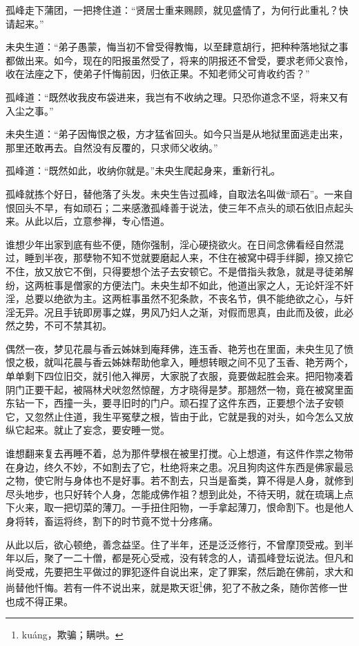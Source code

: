 \documentclass[a4paper,12pt,UTF8,twoside]{ctexbook}
\begin{document}
孤峰走下蒲团，一把搀住道：“贤居士重来赐顾，就见盛情了，为何行此重礼？快请起来。”

未央生道：“弟子愚蒙，悔当初不曾受得教悔，以至肆意胡行，把种种落地狱之事都做出来。如今，现在的阳报虽然受了，将来的阴报还不曾受，要求老师父哀怜，收在法座之下，使弟子忏悔前因，归依正果。不知老师父可肯收约否？”

孤峰道：“既然收我皮布袋进来，我岂有不收纳之理。只恐你道念不坚，将来又有入尘之事。”

未央生道：“弟子因悔恨之极，方才猛省回头。如今只当是从地狱里面逃走出来，那里还敢再去。自然没有反覆的，只求师父收纳。”

孤峰道：“既然如此，收纳你就是。”未央生爬起身来，重新行礼。

孤峰就拣个好日，替他落了头发。未央生告过孤峰，自取法名叫做“顽石”。一来自恨回头不早，有如顽石；二来感激孤峰善于说法，使三年不点头的顽石依旧点起头来。从此以后，立意参禅，专心悟道。

谁想少年出家到底有些不便，随你强制，淫心硬挠欲火。在日间念佛看经自然混过，睡到半夜，那孽物不知不觉就要磨起人来，不住在被窝中碍手绊脚，捺又捺它不住，放又放它不倒，只得要想个法子去安顿它。不是借指头救急，就是寻徒弟解纷，这两桩事是僧家的方便法门。未央生却不如此，他道出家之人，无论奸淫不奸淫，总要以绝欲为主。这两桩事虽然不犯条款，不丧名节，俱不能绝欲之心，与奸淫无异。况且手铳即房事之媒，男风乃妇人之渐，对假而思真，由此而及彼，此必然之势，不可不禁其初。

偶然一夜，梦见花晨与香云姊妹到庵拜佛，连玉香、艳芳也在里面，未央生见了愤恨之极，就叫花晨与香云姊妹帮助他拿入，睡想转眼之间不见了玉香、艳芳两个，单单剩下四位旧交，就引他入禅房，大家脱了衣服，竟要做起胜会来。把阳物凑着阴门正要干起，被隔林犬吠忽然惊醒，方才晓得是梦。那翘然一物，竟在被窝里面东钻一下，西撞一头，要寻旧时的门户。顽石捏了这件东西，正要想个法子安顿它，又忽然止住道，我生平冤孽之根，皆由于此，它就是我的对头，如今怎么又放纵它起来。就止了妄念，要安睡一觉。

谁想翻来复去再睡不着，总为那件孽根在被里打搅。心上想道，有这件作祟之物带在身边，终久不妙，不如割去了它，杜绝将来之患。况且狗肉这件东西是佛家最忌之物，使它附与身体也不是好事。若不割去，只当是畜类，算不得是人身，就修到尽头地步，也只好转个人身，怎能成佛作祖？想到此处，不待天明，就在琉璃上点下火来，取一把切菜的薄刀。一手扭住阳物，一手拿起薄刀，恨命割下。也是他人身将转，畜运将终，割下的时节竟不觉十分疼痛。

从此以后，欲心顿绝，善念益坚。住了半年，还是泛泛修行，不曾摩顶受戒。到半年以后，聚了一二十僧，都是死心受戒，没有转念的人，请孤峰登坛说法。但凡和尚受戒，先要把生平做过的罪犯逐件自说出来，定了罪案，然后跪在佛前，求大和尚替他忏悔。若有一件不说出来，就是欺天诳\footnote{ku\'ang，欺骗；瞒哄。}佛，犯了不赦之条，随你苦修一世也成不得正果。
\end{document}
